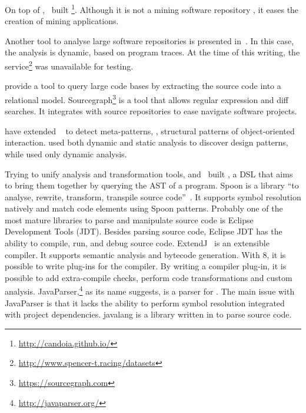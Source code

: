 On top of \boa{},~\cite{tiwariCandoiaPlatformBuilding2017} built \candoia{}%
\footnote{\url{http://candoia.github.io/}}.
Although it is not a mining software repository \perse{},
it eases the creation of mining applications. 

Another tool to analyse large software repositories is presented in~\cite{brandauerSpencerInteractiveHeap2017}.
In this case, the analysis is dynamic, based on program traces. 
At the time of this writing, the service\footnote{\url{http://www.spencer-t.racing/datasets}} was unavailable for testing. 

\cite{bajracharyaSourcererInternetscaleSoftware2009} provide a tool to query large code bases by extracting the source code into a relational model.
Sourcegraph\footnote{\url{https://sourcegraph.com}} is a tool that allows regular expression and diff searches.
It integrates with source repositories to ease navigate software projects.

\cite{posnettTHEXMiningMetapatterns2010} have extended
\asm{}~\citep{brunetonASMCodeManipulation2002}
to detect meta-patterns, \ie{},
structural patterns of object-oriented interaction.
\cite{huDynamicAnalysisDesign2008} used both dynamic and static analysis to discover design patterns, while \cite{arcelliDesignPatternDetection2008} used only dynamic analysis.

Trying to unify analysis and transformation tools,
\cite{vinjuHowMakeBridge2006} and~\cite{klintRASCALDomainSpecific2009} built \rascal{},
a DSL that aims to bring them together by querying the AST of a program.
Spoon is a \java{} library
``to analyse, rewrite, transform, transpile \java{} source code''~\citep{pawlak:hal-01169705}.
It supports symbol resolution natively and match code elements using Spoon patterns.
Probably one of the most mature libraries to parse and manipulate \java{} source code is Eclipse \java{} Development Tools (JDT).%
Besides parsing \java{} source code,
Eclipse JDT has the ability to compile, run, and debug \java{} source code.
ExtendJ~\citep{Ekman:2007:JEJ:1297027.1297029} is an extensible \java{} compiler.
It supports semantic analysis and bytecode generation.
With \java{} 8, it is possible to write plug-ins for the \javac{} compiler.
By writing a compiler plug-in, it is possible to add extra-compile checks,
perform code transformations and custom analysis.
JavaParser,\footnote{\url{http://javaparser.org/}} as its name suggests,
is a parser for \java{}.
The main issue with JavaParser is that it lacks the ability to perform symbol resolution integrated with project dependencies.
javalang is a library written in \python{} to parse \java{} source code.

